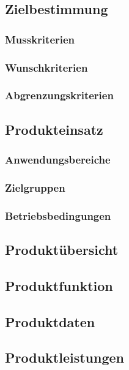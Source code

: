 \subsection{Zielbestimmung}

	\subsubsection{Musskriterien}
	
	\subsubsection{Wunschkriterien}

	\subsubsection{Abgrenzungskriterien}


\subsection{Produkteinsatz}

	\subsubsection{Anwendungsbereiche}
	
	\subsubsection{Zielgruppen}
	
	\subsubsection{Betriebsbedingungen}


\subsection{Produktübersicht}


\subsection{Produktfunktion}


\subsection{Produktdaten}


\subsection{Produktleistungen}


